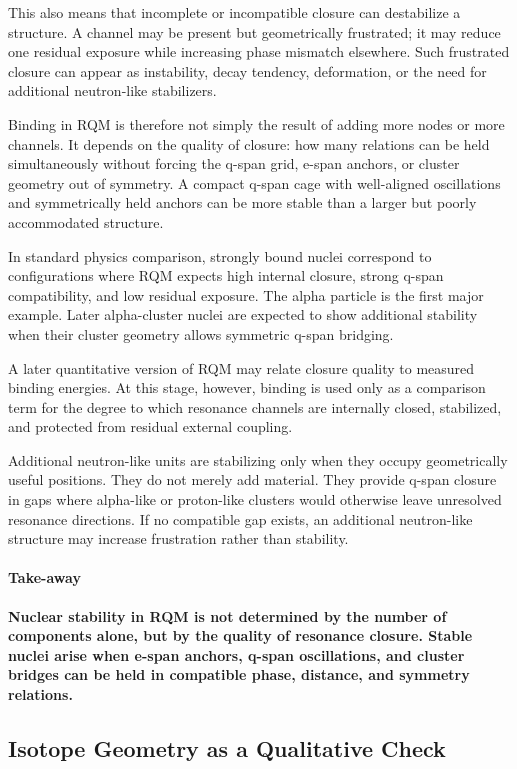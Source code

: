 \documentclass[11pt,a4paper]{article}
\begin{document}
This also means that incomplete or incompatible closure can destabilize a structure. A channel may be present but geometrically frustrated; it may reduce one residual exposure while increasing phase mismatch elsewhere. Such frustrated closure can appear as instability, decay tendency, deformation, or the need for additional neutron-like stabilizers.

Binding in RQM is therefore not simply the result of adding more nodes or more channels. It depends on the quality of closure: how many relations can be held simultaneously without forcing the q-span grid, e-span anchors, or cluster geometry out of symmetry. A compact q-span cage with well-aligned oscillations and symmetrically held anchors can be more stable than a larger but poorly accommodated structure.

In standard physics comparison, strongly bound nuclei correspond to configurations where RQM expects high internal closure, strong q-span compatibility, and low residual exposure. The alpha particle is the first major example. Later alpha-cluster nuclei are expected to show additional stability when their cluster geometry allows symmetric q-span bridging.

A later quantitative version of RQM may relate closure quality to measured binding energies. At this stage, however, binding is used only as a comparison term for the degree to which resonance channels are internally closed, stabilized, and protected from residual external coupling.

Additional neutron-like units are stabilizing only when they occupy geometrically useful positions. They do not merely add material. They provide q-span closure in gaps where alpha-like or proton-like clusters would otherwise leave unresolved resonance directions. If no compatible gap exists, an additional neutron-like structure may increase frustration rather than stability.

\paragraph{Take-away}
\textbf{Nuclear stability in RQM is not determined by the number of components alone, but by the quality of resonance closure. Stable nuclei arise when e-span anchors, q-span oscillations, and cluster bridges can be held in compatible phase, distance, and symmetry relations.}


\subsection{Isotope Geometry as a Qualitative Check}
\end{document}
